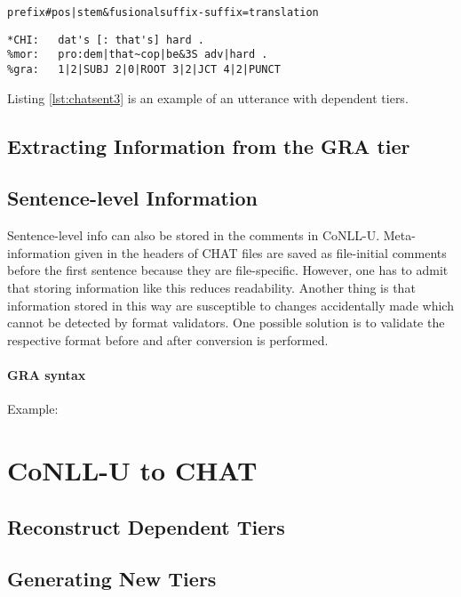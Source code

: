 
\texttt{prefix\#pos|stem\&fusionalsuffix-suffix=translation}

\lstset{
numbers = none,
frame = single,
}

\begin{lstlisting}[caption={Excerpt from Adam/040217.cha of the Brown Corpus (\cite{brown1973})}, label={lst:chatsent3}]
*CHI:   dat's [: that's] hard .
%mor:   pro:dem|that~cop|be&3S adv|hard .
%gra:   1|2|SUBJ 2|0|ROOT 3|2|JCT 4|2|PUNCT
\end{lstlisting}

Listing \ref{lst:chatsent3} is an example of an utterance with dependent tiers.\\

\subsection{Extracting Information from the GRA tier}

\subsection{Sentence-level Information}
Sentence-level info can also be stored in the comments in CoNLL-U. Meta-information given in the headers of CHAT files are saved as file-initial comments before the first sentence because they are file-specific.
However, one has to admit that storing information like this reduces readability. Another thing is that information stored in this way are susceptible to changes accidentally made which cannot be detected by format validators. One possible solution is to validate the respective format before and after conversion is performed.


\paragraph{GRA syntax}
Example:


\section{CoNLL-U to CHAT}

\subsection{Reconstruct Dependent Tiers}

\subsection{Generating New Tiers}
